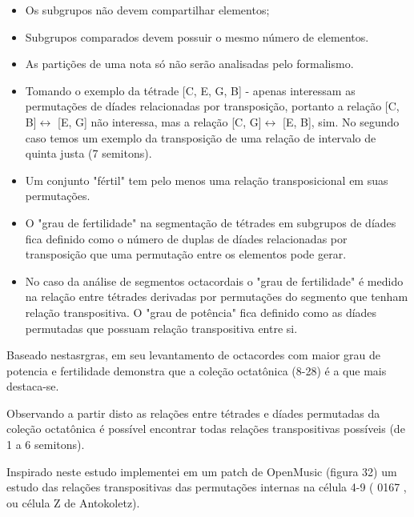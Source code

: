 \documentclass[
	12pt,				%
	openright,			%
	twoside,			%
	a4paper,			%
	english,			%
	french,				%
	spanish,			%
	brazil				%
	]{abntex2}
\begin{document}
\begin{itemize}
\item Os subgrupos não devem compartilhar elementos;
\item Subgrupos comparados devem possuir o mesmo número de elementos. 
\item As partições de uma nota só não serão analisadas pelo formalismo.
\item Tomando o exemplo da tétrade [C, E, G, B] - apenas interessam as permutações de díades relacionadas por transposição, portanto a relação [C, B]$\leftrightarrow $ [E, G] não interessa, mas a relação [C, G]$\leftrightarrow $ [E, B], sim. No segundo caso temos um exemplo da transposição de uma relação de intervalo de quinta justa (7 semitons).
\item Um conjunto "fértil" tem pelo menos uma relação transposicional em suas permutações.
\item O "grau de fertilidade" na segmentação de tétrades em subgrupos de díades fica definido como o número de duplas de díades relacionadas por transposição que uma permutação entre os elementos pode gerar.
\item No caso da análise de segmentos octacordais o "grau de fertilidade" é medido na relação entre tétrades derivadas por permutações do segmento que tenham relação transpositiva. O "grau de potência" fica definido como as díades permutadas que possuam relação transpositiva entre si.

\end{itemize}


Baseado nestasrgras, em seu levantamento de octacordes com maior grau de potencia e fertilidade \cite{cohn1991bartok} demonstra que a coleção octatônica (8-28) é a que mais destaca-se.


Observando a partir disto as relações entre tétrades e díades permutadas da coleção octatônica é possível encontrar todas relações transpositivas possíveis (de 1 a 6 semitons).


Inspirado neste estudo implementei em um patch de OpenMusic (figura 32) um estudo das relações transpositivas das permutações internas na célula 4-9 ( 0167 , ou célula Z de Antokoletz).
\end{document}
